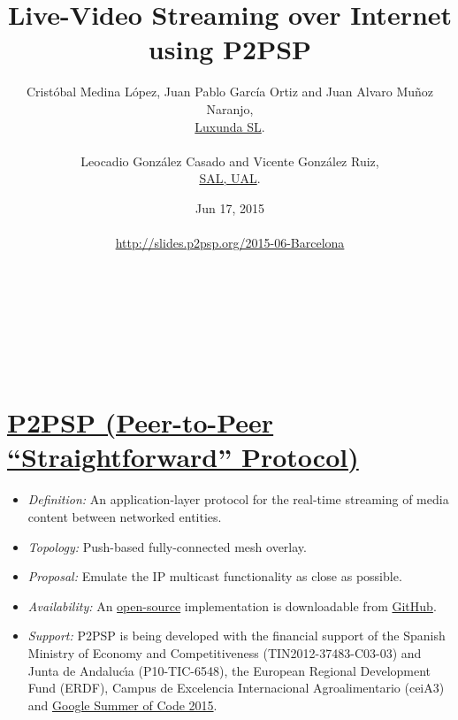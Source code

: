 \documentclass{article}
\author{%
Crist\'obal Medina L\'opez, Juan Pablo Garc\'ia Ortiz and Juan Alvaro Mu\~noz Naranjo,\\\href{http://www.luxunda.es/}{Luxunda SL}. \\
~\\
Leocadio Gonz\'alez Casado and Vicente Gonz\'alez Ruiz,\\\href{http://www.hpca.ual.es/}{SAL, UAL}.
}
\title{Live-Video Streaming over Internet using P2PSP}
\date{Jun 17, 2015 \\~\\ \url{http://slides.p2psp.org/2015-06-Barcelona} \\~\\ \thankss}
\begin{document}



{}\selectfont


\maketitle

~\\
~\\
~\\

\section{\href{http://www.p2psp.org/en/}{P2PSP (Peer-to-Peer ``Straightforward'' Protocol)}}

\begin{itemize}
\item \emph{Definition:} An application-layer protocol for the real-time streaming of media
  content between networked entities.
\item \emph{Topology:} Push-based fully-connected mesh overlay.
\ifx \HCode\Undfef
\else
{}
\fi

\item \emph{Proposal:} Emulate the IP multicast functionality as close as possible.
\item \emph{Availability:} An
  \href{https://www.gnu.org/copyleft/gpl.html}{open-source}
  implementation is downloadable from
  \href{https://github.com/p2psp}{GitHub}.
\item \emph{Support:} P2PSP is being developed with the financial
  support of the Spanish Ministry of Economy and Competitiveness
  (TIN2012-37483-C03-03) and Junta de Andaluc\'{\i}a (P10-TIC-6548),
  the European Regional Development Fund (ERDF), Campus de Excelencia
  Internacional Agroalimentario (ceiA3) and
  \href{http://www.google-melange.com/gsoc/org/list/public/google/gsoc2015}{Google
    Summer of Code 2015}.
\end{itemize}
\end{document}
